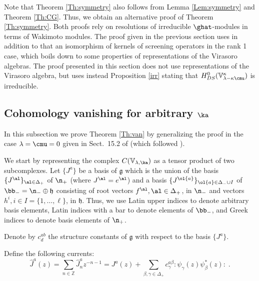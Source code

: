 \documentclass{amsart}
\newcommand{\wh}{\widehat}
\newcommand{\+}{\mathop{\oplus}}
\renewcommand{\*}{{\otimes}}
\newcommand{\mf}{\mathfrak}
\newcommand{\mb}{\mathbb}
\newcommand{\g}{\mf{g}}
\newcommand{\h}{\mf{h}}
\newcommand{\Z}{\mathbb{Z}}
\newcommand{\lam}{\lambda}
\theoremstyle{theorem}
\theoremstyle{remark}
\numberwithin{equation}{section}
\begin{document}
Note that Theorem \ref{Th:symmetry} also follows from Lemma
\ref{Lem:symmetry} and Theorem \ref{Th:CG}. Thus, we obtain an
alternative proof of Theorem \ref{Th:symmetry}. Both proofs rely on
resolutions of irreducible $\ghat$-modules in terms of Wakimoto
modules. The proof given in the previous section uses in addition to
that an isomorphism of kernels of screening operators in the rank 1
case, which boils down to some properties of representations of the
Virasoro algebras. The proof presented in this section does not use
representations of the Virasoro algebra, but uses instead Proposition
\ref{irr} stating that $H^0_{DS}(\mathbb{V}_{\lam-\kappa\cmu}^\kappa)$
is irreducible.

\subsection{Cohomology vanishing for arbitrary
  $\ka$}    \label{vangen}

In this subsection we prove Theorem \ref{Th:van} by generalizing the
proof in the case $\lam=\cmu=0$ given in Sect.\ 15.2 of
\cite{FreBen04} (which followed \cite{dBT}).

We start by representing the complex $C({\mb V}_{\lam,\ka})$ as a tensor
product of two subcomplexes. Let $\{ J^a \}$ be a basis of $\g$ which
is the union of the basis
$\{ J^\al \}_{\al \in \Delta_+}$ of $\n_+$ (where $J^\al = e^\al$)
and a basis $\{ J^{\ol{a}} \}_{\ol{a} \in \Delta_- \cup I}$ of $\bb_-
= \n_- \oplus \h$ consisting of root vectors $f^\al, \al \in
\Delta_+$, in $\n_-$ and vectors $h^i, i \in I = \{
1,\ldots,\ell \}$, in $\h$. Thus, we use Latin upper indices to denote
arbitrary basis elements, Latin indices with a bar to denote elements
of $\bb_-$, and Greek indices to denote basis elements of $\n_+$.

Denote by $c^{ab}_d$ the structure constants of $\g$ with respect to
the basis $\{ J^a \}$.

Define the following currents:
\begin{equation}    \label{whJ}
\wh{J}^a(z) = \sum_{n\in\Z} \wh{J}^a_n z^{-n-1} = J^a(z) +
\sum_{\beta,\gamma \in \Delta_+} c^{a\beta}_\gamma : \! \psi_\gamma(z)
\psi^*_\beta(z)\! : \; .
\end{equation}
\end{document}
